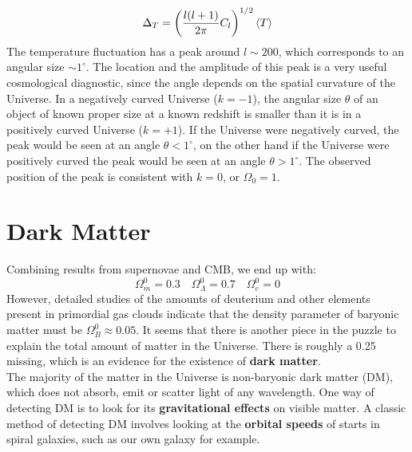 \documentclass[10.75pt,a4paper,openright,bottom=2cm]{article}
\begin{document}
\[
\Delta_T=\left(\frac{l(l+1)}{2\pi}C_l\right)^{1/2}\Braket{T}
\]
The temperature fluctuation has a peak around $l\sim200$, which corresponds to an angular size $\sim1^\circ$. The location and the amplitude of this peak is a very useful cosmological diagnostic, since the angle depends on the spatial curvature of the Universe. In a negatively curved Universe ($k=-1$), the angular size $\theta$ of an object of known proper size at a known redshift is smaller than it is in a positively curved Universe ($k=+1$). If the Universe were negatively curved, the peak would be seen at an angle $\theta<1^\circ$, on the other hand if the Universe were positively curved the peak would be seen at an angle $\theta>1^\circ$. The observed position of the peak is consistent with $k=0$, or $\Omega_0=1$.
\newpage
\section{Dark Matter}
Combining results from supernovae and CMB, we end up with:
\[
\Omega_m^0=0.3 \quad \Omega_\Lambda^0=0.7 \quad \Omega_c^0=0
\]
However, detailed studies of the amounts of deuterium and other elements present in primordial gas clouds indicate that the density parameter of baryonic matter must be $\Omega_B^0\approx0.05$. It seems that there is another piece in the puzzle to explain the total amount of matter in the Universe. There is roughly a 0.25 missing, which is an evidence for the existence of \textbf{dark matter}.\\
The majority of the matter in the Universe is non-baryonic dark matter (DM), which does not absorb, emit or scatter light of any wavelength. One way of detecting DM is to look for its \textbf{gravitational effects} on visible matter. A classic method of detecting DM involves looking at the \textbf{orbital speeds} of starts in spiral galaxies, such as our own galaxy for example.\\
\end{document}
